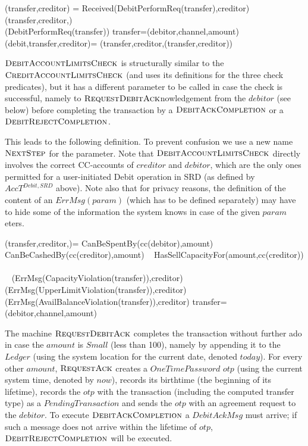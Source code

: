 \begin{asm}
(transfer,creditor)  =\+
\IF Received(DebitPerformReq(transfer),\FROM creditor) \THEN \+  
   (transfer,creditor,)\\
   (DebitPerformReq(transfer))\-
\WHERE \+
transfer=(debitor,channel,amount)\\
(debit,transfer,creditor)=\+
(transfer,creditor,(transfer,creditor))
\end{asm}

$\hbox{\sc DebitAccountLimitsCheck}$ is structurally similar to the $\hbox{\sc CreditAccountLimitsCheck}$ (and uses its definitions for the three check predicates), but it has a different parameter to be called in case the check is successful, namely to $\hbox{\sc RequestDebitAck}$nowledgement from the $debitor$ (see below) before completing the transaction by a $\hbox{\sc DebitAckCompletion}$ or a $\hbox{\sc DebitRejectCompletion}$. 

This leads to the following definition. To prevent confusion we use a new name 
$\hbox{\sc NextStep}$ for the parameter. Note that $\hbox{\sc DebitAccountLimitsCheck}$ 
directly involves the correct CC-accounts of $creditor$ and $debitor$, which are 
the only ones permitted for a user-initiated Debit operation in SRD (as defined by $AccT^{Debit,SRD}$ above). Note also that for privacy reasons, the definition of the content of an $ErrMsg(param)$ (which has to be defined separately) may have to hide some of the information the system knows in case of the given $param$eters.


\begin{asm}
(transfer,creditor,)=\+
  \IF CanBeSpentBy(cc(debitor),amount) \+
    \THEN ~ \IF CanBeCashedBy(cc(creditor),amount) \+
       \THEN ~ \IF HasSellCapacityFor(amount,cc(creditor)) \+
           \THEN ~  \\
           \ELSE 
           ~ (ErrMsg(CapacityViolation(transfer)),\TO creditor)\-
       \ELSE 
       ~ (ErrMsg(UpperLimitViolation(transfer)),\TO creditor)\-
   \ELSE 
    ~ (ErrMsg(AvailBalanceViolation(transfer)),\TO creditor)\dec\-
 \WHERE \+
    transfer=(debitor,channel,amount)
\end{asm}


The machine  $\hbox{\sc RequestDebitAck}$ completes the transaction without further 
ado in case  the $amount$ is $Small$ (less than 100), namely by appending it to the $Ledger$ (using the system location for the current date, denoted $today$). For every other $amount$, $\hbox{\sc RequestAck}$ creates a $OneTimePassword$ $otp$ (using the current system time, denoted by $now$), records its birthtime (the beginning of its lifetime), records the $otp$ with the transaction (including the computed transfer type) as a $PendingTransaction$ and sends the $otp$  with an agreement request to the $debitor$. To execute $\hbox{\sc DebitAckCompletion}$ a $DebitAckMsg$ must arrive; if such a message does not arrive within the lifetime of $otp$, $\hbox{\sc DebitRejectCompletion}$ will be executed.

